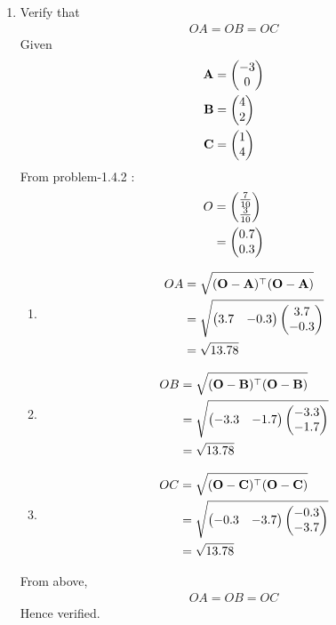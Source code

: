 \documentclass[11pt]{book}
\begin{document}
\begin{enumerate}[label=\thesection.\arabic*.,ref=\thesection.\theenumi]
\item Verify that 
\begin{align}
OA = OB = OC 
\end{align} 
\solution
Given \begin{align}
\mathbf{A} &= \begin{pmatrix}-3\\0\end{pmatrix}\\
\mathbf{B} &= \begin{pmatrix}4\\2\end{pmatrix}\\
\mathbf{C} &= \begin{pmatrix}1\\4\end{pmatrix}
\end{align}
From problem-1.4.2 :
\begin{align}
O &= \begin{pmatrix}\frac{7}{10}\\ \frac{3}{10}\end{pmatrix}\\
 &= \begin{pmatrix}0.7\\0.3\end{pmatrix}
\end{align}
\begin{enumerate}
\item 
\begin{align}
OA &= \sqrt{(\mathbf{O}-\mathbf{A})^{\top}(\mathbf{O}-\mathbf{A})}\\
&= \sqrt{\begin{pmatrix}3.7 & -0.3\end{pmatrix} \begin{pmatrix}3.7\\ -0.3\end{pmatrix}}\\
 &= \sqrt{13.78}\\
\end{align}
\item 
\begin{align}
OB &= \sqrt{(\mathbf{O}-\mathbf{B})^{\top}(\mathbf{O}-\mathbf{B})}\\
 &= \sqrt{\begin{pmatrix}-3.3 & -1.7\end{pmatrix} \begin{pmatrix}-3.3\\ -1.7\end{pmatrix}}\\
 &= \sqrt{13.78}\\
\end{align}
\item 
\begin{align}
OC &= \sqrt{(\mathbf{O}-\mathbf{C})^{\top}(\mathbf{O}-\mathbf{C})}\\
 &= \sqrt{\begin{pmatrix}-0.3 & -3.7\end{pmatrix}  \begin{pmatrix}-0.3\\ -3.7\end{pmatrix}}\\
 &= \sqrt{13.78}\\
\end{align}
\end{enumerate}
From above, 
\begin{align}
OA = OB = OC
\end{align}
Hence verified.


\end{enumerate}
\end{document}

